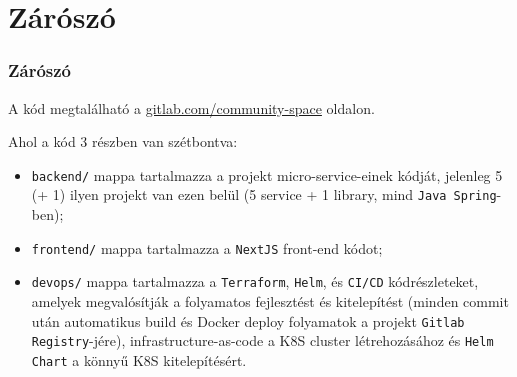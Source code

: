 \section{Zárószó}

\begin{frame}
    \frametitle{Zárószó}

    A kód megtalálható a \href{https://gitlab.com/rockdonald2/community-space}{gitlab.com/community-space} oldalon.

    \medbreak

    Ahol a kód 3 részben van szétbontva:
    \begin{itemize}
        \item \texttt{backend/} mappa tartalmazza a projekt micro-service-einek kódját, jelenleg 5 (+ 1) ilyen projekt van ezen belül (5 service + 1 library, mind \texttt{Java Spring}-ben);
        \item \texttt{frontend/} mappa tartalmazza a \texttt{NextJS} front-end kódot;
        \item \texttt{devops/} mappa tartalmazza a \texttt{Terraform}, \texttt{Helm}, és \texttt{CI/CD} kódrészleteket, amelyek megvalósítják a folyamatos fejlesztést és kitelepítést (minden commit után automatikus build és Docker deploy folyamatok a projekt \texttt{Gitlab Registry}-jére), infrastructure-as-code a K8S cluster létrehozásához és \texttt{Helm Chart} a könnyű K8S kitelepítésért.
    \end{itemize}

\end{frame}
